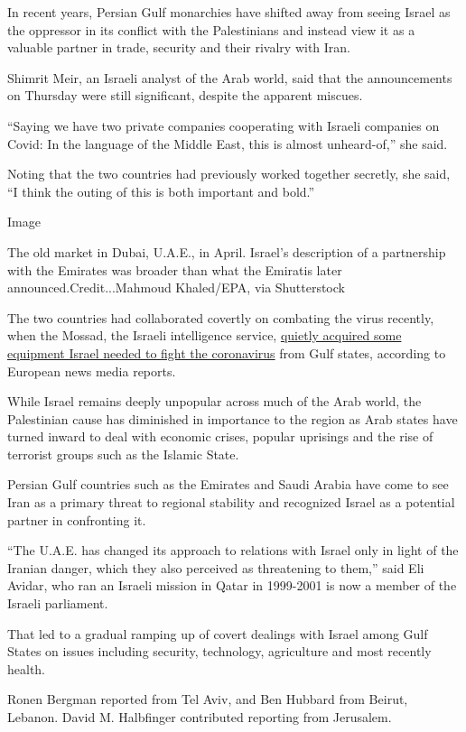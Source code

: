 In recent years, Persian Gulf monarchies have shifted away from seeing
Israel as the oppressor in its conflict with the Palestinians and
instead view it as a valuable partner in trade, security and their
rivalry with Iran.

Shimrit Meir, an Israeli analyst of the Arab world, said that the
announcements on Thursday were still significant, despite the apparent
miscues.

``Saying we have two private companies cooperating with Israeli
companies on Covid: In the language of the Middle East, this is almost
unheard-of,'' she said.

Noting that the two countries had previously worked together secretly,
she said, ``I think the outing of this is both important and bold.''

Image

The old market in Dubai, U.A.E., in April. Israel's description of a
partnership with the Emirates was broader than what the Emiratis later
announced.Credit...Mahmoud Khaled/EPA, via Shutterstock

The two countries had collaborated covertly on combating the virus
recently, when the Mossad, the Israeli intelligence service,
\href{https://www.nytimes3xbfgragh.onion/2020/04/12/world/middleeast/coronavirus-israel-mossad.html}{quietly
acquired some equipment Israel needed to fight the coronavirus} from
Gulf states, according to European news media reports.

While Israel remains deeply unpopular across much of the Arab world, the
Palestinian cause has diminished in importance to the region as Arab
states have turned inward to deal with economic crises, popular
uprisings and the rise of terrorist groups such as the Islamic State.

Persian Gulf countries such as the Emirates and Saudi Arabia have come
to see Iran as a primary threat to regional stability and recognized
Israel as a potential partner in confronting it.

``The U.A.E. has changed its approach to relations with Israel only in
light of the Iranian danger, which they also perceived as threatening to
them,'' said Eli Avidar, who ran an Israeli mission in Qatar in
1999-2001 is now a member of the Israeli parliament.

That led to a gradual ramping up of covert dealings with Israel among
Gulf States on issues including security, technology, agriculture and
most recently health.

Ronen Bergman reported from Tel Aviv, and Ben Hubbard from Beirut,
Lebanon. David M. Halbfinger contributed reporting from Jerusalem.

